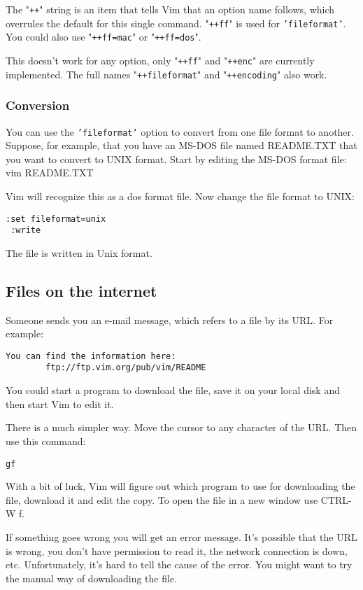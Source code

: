 The "\texttt{++}" string is an item that tells Vim that an option name follows, which overrules the default for this single command.
"\texttt{++ff}" is used for \texttt{'fileformat'}.
You could also use "\texttt{++ff=mac}" or "\texttt{++ff=dos}".

This doesn't work for any option, only "\texttt{++ff}" and "\texttt{++enc}" are currently implemented.
The full names "\texttt{++fileformat}" and "\texttt{++encoding}" also work.
\subsubsection{Conversion}
You can use the \texttt{'fileformat'} option to convert from one file format to another.
Suppose, for example, that you have an MS-DOS file named README.TXT that you want to convert to UNIX format.
Start by editing the MS-DOS format file: vim README.TXT

Vim will recognize this as a dos format file.
Now change the file format to UNIX:

\begin{Verbatim}[samepage=true]
 :set fileformat=unix
 :write
\end{Verbatim}

The file is written in Unix format.
\subsection{Files on the internet}
Someone sends you an e-mail message, which refers to a file by its URL.
For example:

\begin{Verbatim}[samepage=true]
    You can find the information here: 
        ftp://ftp.vim.org/pub/vim/README 
\end{Verbatim}

You could start a program to download the file, save it on your local disk and then start Vim to edit it.

There is a much simpler way.
Move the cursor to any character of the URL.
Then use this command:

\begin{Verbatim}[samepage=true]
 gf
\end{Verbatim}

With a bit of luck, Vim will figure out which program to use for downloading the file, download it and edit the copy.
To open the file in a new window use CTRL-W f.

If something goes wrong you will get an error message.
It's possible that the URL is wrong, you don't have permission to read it, the network connection is down, etc.
Unfortunately, it's hard to tell the cause of the error.
You might want to try the manual way of downloading the file.

